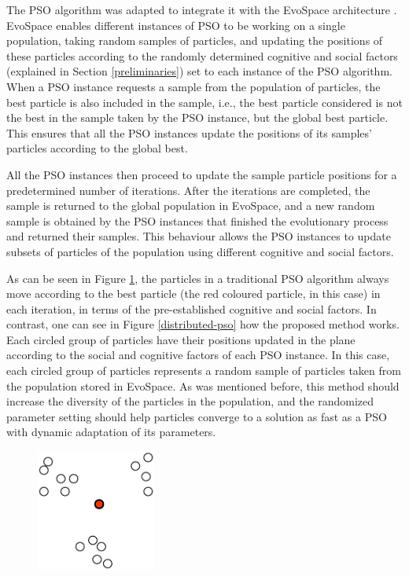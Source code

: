 \documentclass[runningheads,a4paper]{llncs}
\begin{document}
The PSO algorithm was adapted to integrate it with the EvoSpace
architecture \cite{garcia2015evospace}. EvoSpace enables different
instances of PSO to be working on a single population, taking random
samples of particles, and updating the positions of these particles
according to the randomly determined cognitive and social factors
(explained in Section \ref{preliminaries}) set to each instance of the
PSO algorithm. When a PSO instance requests a sample from the
population of particles, the best particle is also included in
the sample, i.e., the best particle considered is not the best in the
sample taken by the PSO instance, but the global best particle. This
ensures that all the PSO instances update the positions of its
samples' particles according to the global best.

All the PSO instances then proceed to update the sample particle
positions for a predetermined number of iterations. After the
iterations are completed, the sample is returned to the global
population in EvoSpace, and a new random sample is obtained by the PSO
instances that finished the evolutionary process and returned their
samples. This behaviour allows the PSO instances to update subsets of
particles of the population using different cognitive and social
factors.

As can be seen in Figure \ref{traditional-pso}, the particles in a
traditional PSO algorithm always move according to the best particle
(the red coloured particle, in this case) in each iteration, in terms
of the pre-established cognitive and
social factors. In contrast, one can see in Figure
\ref{distributed-pso} how the proposed method works. Each circled
group of particles have their positions updated in the plane according to the
social and cognitive factors of each PSO instance. In this case, each
circled group of particles represents a random sample of particles
taken from the population stored in EvoSpace. As was mentioned before,
this method should increase the diversity of the particles in the
population, and the randomized parameter setting should help particles
converge to a solution as fast as a PSO with dynamic adaptation of its
parameters.

\begin{figure}
  \centering
  \includegraphics[height=4cm]{pdf/traditional-pso}
  \caption{}
  \label{traditional-pso}
\end{figure}
\end{document}
